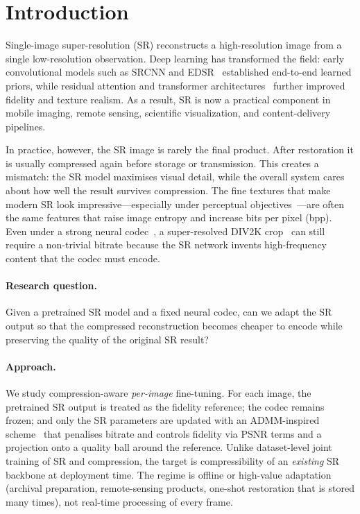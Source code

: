 \section{Introduction}
\label{sec:intro}

Single-image super-resolution (SR) reconstructs a high-resolution image from a
single low-resolution observation. Deep learning has transformed the field:
early convolutional models such as SRCNN and EDSR~\cite{dong2014srcnn,lim2017edsr}
established end-to-end learned priors, while residual attention and transformer
architectures~\cite{zhang2018rcan,liang2021swinir,conde2022swin2sr} further
improved fidelity and texture realism. As a result, SR is now a practical
component in mobile imaging, remote sensing, scientific visualization, and
content-delivery pipelines.

In practice, however, the SR image is rarely the final product. After restoration
it is usually compressed again before storage or transmission. This creates a
mismatch: the SR model maximises visual detail, while the overall system cares
about how well the result survives compression. The fine textures that make
modern SR look impressive---especially under perceptual
objectives~\cite{ledig2017srgan,blau2018perception}---are often the same
features that raise image entropy and increase bits per pixel (bpp). Even under
a strong neural codec~\cite{cheng2020learned}, a super-resolved DIV2K
crop~\cite{Timofte_2018_CVPR_Workshops} can still require a non-trivial bitrate
because the SR network invents high-frequency content that the codec must encode.

\paragraph{Research question.}
Given a pretrained SR model and a fixed neural codec, can we adapt the SR output
so that the compressed reconstruction becomes cheaper to encode while preserving
the quality of the original SR result?

\paragraph{Approach.}
We study compression-aware \emph{per-image} fine-tuning. For each image, the
pretrained SR output is treated as the fidelity reference; the codec remains
frozen; and only the SR parameters are updated with an ADMM-inspired
scheme~\cite{boyd2011admm} that penalises bitrate and controls fidelity via
PSNR terms and a projection onto a quality ball around the reference. Unlike
dataset-level joint training of SR and compression, the target is compressibility
of an \emph{existing} SR backbone at deployment time. The regime is offline or
high-value adaptation (archival preparation, remote-sensing products, one-shot
restoration that is stored many times), not real-time processing of every frame.

